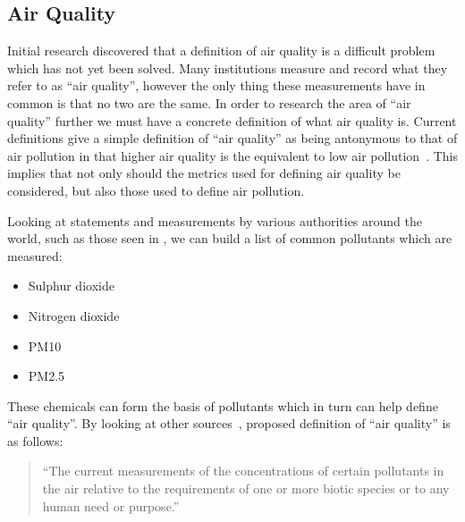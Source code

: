 \subsection{Air Quality}\label{background_air_quality}

Initial research discovered that a definition of air quality is a difficult problem which has not yet been solved. Many institutions measure and record what they refer to as ``air quality'', however the only thing these measurements have in common is that no two are the same. In order to research the area of ``air quality'' further we must have a concrete definition of what air quality is. Current definitions give a simple definition of ``air quality'' as being antonymous to that of air pollution in that higher air quality is the equivalent to low air pollution~\cite{bcaq}. This implies that not only should the metrics used for defining air quality be considered, but also those used to define air pollution.

Looking at statements and measurements by various authorities around the world, such as those seen in \cite{epapollutants,airqualityobjectives,cleanairnavigation,naaqs,whoguidelines}, we can build a list of common pollutants which are measured:


\begin{itemize}
\item Sulphur dioxide
\item Nitrogen dioxide
\item PM10 
\item PM2.5
\end{itemize}

These chemicals can form the basis of pollutants which in turn can help define ``air quality''. By looking at other sources~\cite{meaningsofenvironmentalterms},  proposed definition of ``air quality'' is as follows:

\begin{quote}
``The current measurements of the concentrations of certain pollutants in the air relative to the requirements of one or more biotic species or to any human need or purpose.''
\end{quote}
